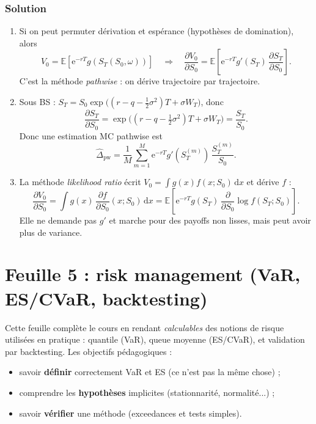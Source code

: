 \documentclass[11pt,a4paper]{report}
\newcommand{\dd}{\mathrm{d}}
\newcommand{\ee}{\mathrm{e}}
\newcommand{\E}{\mathbb{E}}
\newcommand{\1}{\mathbbm{1}}
\newcommand{\pd}[2]{\frac{\partial #1}{\partial #2}}
\theoremstyle{definition}
\theoremstyle{plain}
\theoremstyle{remark}
\begin{document}
\subsection*{Solution}
\begin{enumerate}[label=\alph*)]
  \item Si on peut permuter dérivation et espérance (hypothèses de domination), alors
  \[V_0=\E[\ee^{-rT}g(S_T(S_0,\omega))]\quad\Rightarrow\quad \pd{V_0}{S_0}=\E\left[\ee^{-rT}g'(S_T)\,\pd{S_T}{S_0}\right].\]
  C'est la méthode \emph{pathwise} : on dérive trajectoire par trajectoire.
  \item Sous BS : $S_T=S_0\exp\bigl((r-q-\tfrac12\sigma^2)T+\sigma W_T\bigr)$, donc
  \[\pd{S_T}{S_0}=\exp\bigl((r-q-\tfrac12\sigma^2)T+\sigma W_T\bigr)=\frac{S_T}{S_0}.
  \]
  Donc une estimation MC pathwise est
  \[\widehat{\Delta}_{\mathrm{pw}}=\frac{1}{M}\sum_{m=1}^M \ee^{-rT}g'(S_T^{(m)})\,\frac{S_T^{(m)}}{S_0}.
  \]
  \item La méthode \emph{likelihood ratio} écrit $V_0=\int g(x)f(x;S_0)\,\dd x$ et dérive $f$ :
  \[\pd{V_0}{S_0}=\int g(x)\,\pd{f}{S_0}(x;S_0)\,\dd x = \E\left[\ee^{-rT}g(S_T)\,\pd{}{S_0}\log f(S_T;S_0)\right].\]
  Elle ne demande pas $g'$ et marche pour des payoffs non lisses, mais peut avoir plus de variance.
\end{enumerate}

\chapter{Feuille 5 : risk management (VaR, ES/CVaR, backtesting)}
\label{chap:td5}

Cette feuille complète le cours en rendant \emph{calculables} des notions de risque utilisées en pratique :
quantile (VaR), queue moyenne (ES/CVaR), et validation par backtesting.
Les objectifs pédagogiques :
\begin{itemize}
  \item savoir \textbf{définir} correctement VaR et ES (ce n'est pas la même chose) ;
  \item comprendre les \textbf{hypothèses} implicites (stationnarité, normalité...) ;
  \item savoir \textbf{vérifier} une méthode (exceedances et tests simples).
\end{itemize}
\end{document}
